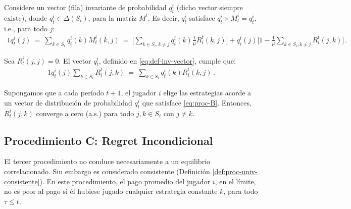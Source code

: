 Considere un vector (fila) invariante de probabilidad $q^i_t$ (dicho vector siempre existe), donde $q^i_t\in \Delta(S_i)$, para la matriz $M^t$. Es decir, $q^i_t$ satisface $q^i_t \times M^i_t = q^i_t$, i.e., para todo $j$:
\begin{alignat}{1}
\label{eq:def-inv-vector}
  q^i_t(j)\ 
    =\ \sum_{k\in S_i} q^i_t(k) M^i_t(k,j)\ 
    =\ \bigg[\sum_{k \in S_i, k \neq j} q^i_t(k)\frac{1}{\mu}R^t_i(k,j)\bigg] + q_i^t(j)\biggl[1 - \frac{1}{\mu}\sum_{k \in S_i, k \neq j} R^t_i(j,k)\biggr]\,.
\end{alignat}

\begin{theorem}
\label{theo:def-proc-B}
Sea $R_t^i(j, j) = 0$. El vector $q_t^i$, definido en \ref{eq:def-inv-vector}, cumple que:
\begin{alignat}{1}
\label{eq:proc-B}
q^i_t(j)\sum_{k \in S_i} R^t_i(j,k)\ =\ \sum_{k \in S_i} q_t^i(k)R_i^t(k,j) \,.
\end{alignat}
\end{theorem}

\begin{theorem}
\label{theo:conv-proc-B}
Supongamos que a cada período $t+1$, el jugador $i$ elige las estrategias acorde a un vector de distribución de probabilidad $q_t^i$ que satisface \eqref{eq:proc-B}. Entonces, $R^i_t(j, k)$ converge a cero (a.s.) para todo $j, k \in S_i$ con $j \neq k$.
\end{theorem}

\subsection*{Procedimiento C: Regret Incondicional}

El tercer procedimiento no conduce necesariamente a un equilibrio correlacionado. Sin embargo es considerado  consistente (Definición \ref{def:proc-univ-consistente}). En este procedimiento, el pago promedio del jugador $i$, en el límite, no es peor al pago si él hubiese jugado cualquier estrategia constante $k$, para todo $\tau \leq t$.

